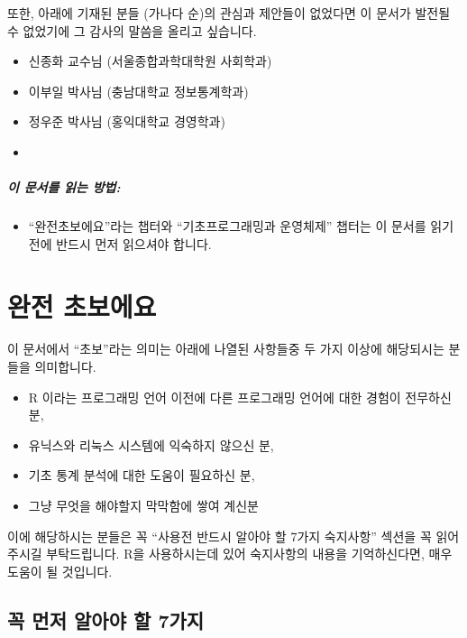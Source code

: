 \documentclass{book}
\begin{document}
또한, 아래에 기재된 분들 (가나다 순)의 관심과 제안들이 없었다면 이 문서가 발전될 수 없었기에 그 감사의 말씀을 올리고 싶습니다. 
\begin{itemize}
\item 신종화 교수님 (서울종합과학대학원 사회학과)
\item 이부일 박사님 (충남대학교 정보통계학과)
\item 정우준 박사님 (홍익대학교 경영학과)
\item 
\end{itemize}

\paragraph{이 문서를 읽는 방법:} 
\begin{itemize}
\item ``완전초보에요''라는 챕터와 ``기초프로그래밍과 운영체제'' 챕터는 이 문서를 읽기 전에 반드시 먼저 읽으셔야 합니다.  
\end{itemize}

%
%
%

\chapter{완전 초보에요}

이 문서에서 ``초보''라는 의미는 아래에 나열된 사항들중 두 가지 이상에 해당되시는 분들을 의미합니다. 

\begin{itemize}
\item R 이라는 프로그래밍 언어 이전에 다른 프로그래밍 언어에 대한 경험이 전무하신 분,
\item 유닉스와 리눅스 시스템에 익숙하지 않으신 분,
\item 기초 통계 분석에 대한 도움이 필요하신 분,
\item 그냥 무엇을 해야할지 막막함에 쌓여 계신분 
\end{itemize}

이에 해당하시는 분들은 꼭 ``사용전 반드시 알아야 할 7가지 숙지사항'' 섹션을 꼭 읽어주시길 부탁드립니다.
R을 사용하시는데 있어 숙지사항의 내용을 기억하신다면, 매우 도움이 될 것입니다. 


\section{꼭 먼저 알아야 할 7가지}
\end{document}
